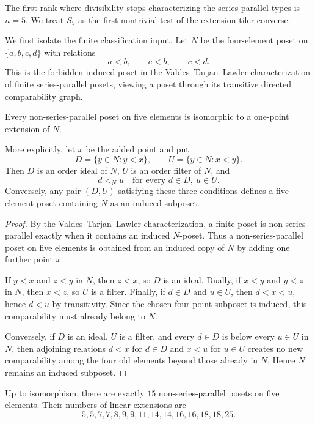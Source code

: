 The first rank where divisibility stops characterizing the
series-parallel types is $n=5$.  We treat $S_5$ as the first nontrivial
test of the extension-tiler converse.

We first isolate the finite classification input.  Let $N$ be the
four-element poset on $\{a,b,c,d\}$ with relations
\[
        a<b,\qquad c<b,\qquad c<d.
\]
This is the forbidden induced poset in the Valdes--Tarjan--Lawler
characterization of finite series-parallel posets, viewing a poset through
its transitive directed comparability graph.

\begin{lemma}
\label{lem:one-point-n-extensions}
Every non-series-parallel poset on five elements is isomorphic to a
one-point extension of $N$.

More explicitly, let $x$ be the added point and put
\[
        D=\{y\in N:y<x\},\qquad U=\{y\in N:x<y\}.
\]
Then $D$ is an order ideal of $N$, $U$ is an order filter of $N$, and
\[
        d<_N u\quad\text{for every }d\in D,\ u\in U.
\]
Conversely, any pair $(D,U)$ satisfying these three conditions defines a
five-element poset containing $N$ as an induced subposet.
\end{lemma}

\begin{proof}
By the Valdes--Tarjan--Lawler characterization, a finite poset is
non-series-parallel exactly when it contains an induced $N$-poset.  Thus a
non-series-parallel poset on five elements is obtained from an induced
copy of $N$ by adding one further point $x$.

If $y<x$ and $z<y$ in $N$, then $z<x$, so $D$ is an ideal.  Dually, if
$x<y$ and $y<z$ in $N$, then $x<z$, so $U$ is a filter.  Finally, if
$d\in D$ and $u\in U$, then $d<x<u$, hence $d<u$ by transitivity.  Since
the chosen four-point subposet is induced, this comparability must already
belong to $N$.

Conversely, if $D$ is an ideal, $U$ is a filter, and every $d\in D$ is below
every $u\in U$ in $N$, then adjoining relations $d<x$ for $d\in D$ and
$x<u$ for $u\in U$ creates no new comparability among the four old
elements beyond those already in $N$.  Hence $N$ remains an induced
subposet.
\end{proof}

\begin{lemma}
\label{lem:s5-profile-table}
Up to isomorphism, there are exactly $15$ non-series-parallel posets on
five elements.  Their numbers of linear extensions are
\[
5,5,7,7,8,9,9,11,14,14,16,16,18,18,25.
\]
\end{lemma}

